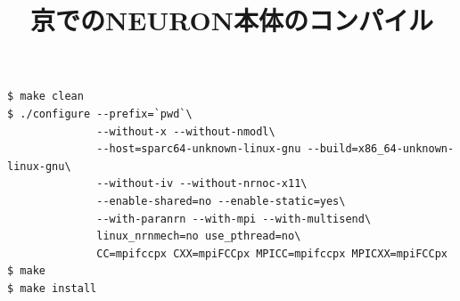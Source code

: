 \begin{table}[h]
  \begin{center}
  \title {京でのNEURON本体のコンパイル}
{\footnotesize
\begin{framed}
\begin{verbatim}
$ make clean
$ ./configure --prefix=`pwd`\
              --without-x --without-nmodl\
              --host=sparc64-unknown-linux-gnu --build=x86_64-unknown-linux-gnu\
              --without-iv --without-nrnoc-x11\
              --enable-shared=no --enable-static=yes\
              --with-paranrn --with-mpi --with-multisend\
              linux_nrnmech=no use_pthread=no\
              CC=mpifccpx CXX=mpiFCCpx MPICC=mpifccpx MPICXX=mpiFCCpx
$ make
$ make install
\end{verbatim}
\end{framed}
}
\end{center}
\end{table}~\\
